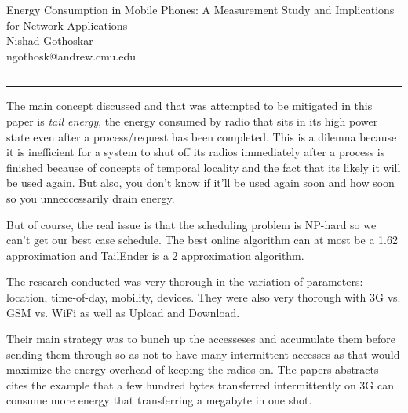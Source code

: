\documentclass[11pt]{article}
\newcommand{\question}[2] {\vspace{.25in} \hrule\vspace{0.5em}
	\noindent{\bf #1: #2} \vspace{0.5em}
	\hrule \vspace{.10in}}
\newcommand{\myname}{Nishad Gothoskar}
\newcommand{\myandrew}{ngothosk}
\begin{document}
	
	\medskip                        %
	
	\thispagestyle{plain}
	\begin{center}                  %
		{\Large Energy Consumption in Mobile Phones: A Measurement Study and Implications for Network Applications} \\
		\myname \\
		\myandrew @andrew.cmu.edu\\
	\end{center}
	
	\question{1}{Summary}
	\quad The main concept discussed and that was attempted to be mitigated in this paper is \textit{tail energy}, the energy consumed by radio that sits in its high power state even after a process/request has been completed. This is a dilemna because it is inefficient for a system to shut off its radios immediately after a process is finished because of concepts of temporal locality and the fact that its likely it will be used again. But also, you don't know if it'll be used again soon and how soon so you unneccessarily drain energy.
	
	\quad But of course, the real issue is that the scheduling problem is NP-hard so we can't get our best case schedule. The best online algorithm can at most be a 1.62 approximation and TailEnder is a 2 approximation algorithm.
	
	\quad The research conducted was very thorough in the variation of parameters: location, time-of-day, mobility, devices. They were also very thorough with 3G vs. GSM vs. WiFi as well as Upload and Download.
	
	\quad Their main strategy was to bunch up the accesseses and accumulate them before sending them through so as not to have many intermittent accesses as that would maximize the energy overhead of keeping the radios on. The papers abstracts cites the example that a few hundred bytes transferred intermittently on 3G can consume more energy that transferring a megabyte in one shot.
	
\end{document}
